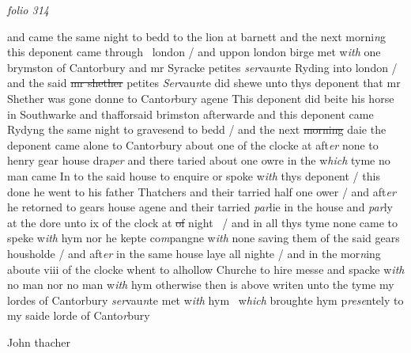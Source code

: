 \documentclass[12pt, a4paper]{book}
\begin{document}
               
               
\dotfill
						\newpage
{}

\textit{folio 314}


 	
				\marginpar[\vspace{0.5cm}{\textcolor{Gray}{n}}]{}
			
 	
		\ifthenelse{\isodd{\thepage}}
		{\reversemarginpar}
		{\normalmarginpar}
		and came the same night to bedd to the lion at barnett
and the next morni\textit{n}g this deponent came through 
 london / and uppon london birge met w\textit{ith} one brymston
of Cantorbury and mr Syracke petites\textit{ ser}vau\textit{n}te
Ryding into london / and the said \sout{mr shether} petites
\textit{Ser}vau\textit{n}te did shewe unto thys deponent that mr
Shether was gone donne to Canto\textit{r}bury agene
This deponent did beite his horse in Southwarke
and thafforsaid brimston afterwarde and this 
deponent came Rydyng the same night to 
gravesend to bedd / and the next \sout{morning }
               daie 
			the 
deponent came alone to Canto\textit{r}bury about
one of the clocke at aft\textit{er} none to henry gear
house dra\textit{per} and there taried about one owre
in the w\textit{hich} tyme no man came In to the said 
house to enquire or spoke w\textit{ith} thys deponent
/ this done he went to his father Thatchers and
their tarried half one ower / and aft\textit{er }he 
retorned to gears house agene and their 
tarried \textit{par}lie in the house and \textit{par}ly at the dore
unto ix of the clock at \sout{of }night  / and in all thys 
tyme none came to speke w\textit{ith }hym nor he
kepte co\textit{m}pangne w\textit{ith} none saving them of
the said gears housholde / and aft\textit{er} in the same
house laye all nighte / and in the mor\textit{n}ing 
aboute viii of the clocke whent to alhollow 
Churche to hire messe and spacke w\textit{ith} no man
nor no man w\textit{ith} hym otherwise then is above
writen unto the tyme my lordes of Cantorbury
\textit{ser}vau\textit{n}te met w\textit{ith} hym  w\textit{hich} broughte hym 
p\textit{rese}ntely to my saide lorde of Canto\textit{r}bury

		\ifthenelse{\isodd{\thepage}}
		{\reversemarginpar}
		{\normalmarginpar}
		John thacher

\dotfill
						\newpage {} \section*{}  \subsection*{}
\end{document}
